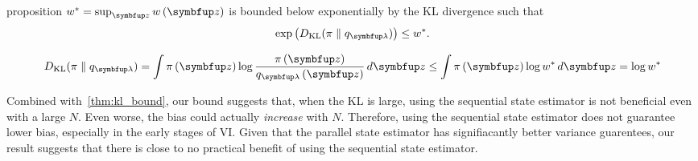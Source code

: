 

\begin{theoremEnd}{proposition}\label{thm:kl_bound}
  \(w^* = \sup_{\vz} w\left(\vz\right) \) is bounded below exponentially by the KL divergence such that
  \[
  \exp\left(\DKL{\pi}{ q_{\vlambda}}\right) \leq w^*.
  \]
\end{theoremEnd}
\vspace{-0.1in}
\begin{proofEnd}
  \begin{align*}
    \DKL{\pi}{ q_{\vlambda} }
    = \int \pi\left(\vz\right) \log \frac{\pi\left(\vz\right)}{q_{\vlambda}\left(\vz\right)}\,d\vz 
    \leq \int \pi\left(\vz\right) \log w^* \, d\vz 
    = \log w^*
  \end{align*}
\end{proofEnd}

Combined with~\cref{thm:kl_bound}, our bound suggests that, when the KL is large, using the sequential state estimator is not beneficial even with a large \(N\).
Even worse, the bias could actually \textit{increase} with \(N\).
Therefore, using the sequential state estimator does not guarantee lower bias, especially in the early stages of VI.
Given that the parallel state estimator has signifiacantly better variance guarentees, our result suggests that there is close to no practical benefit of using the sequential state estimator.



%

